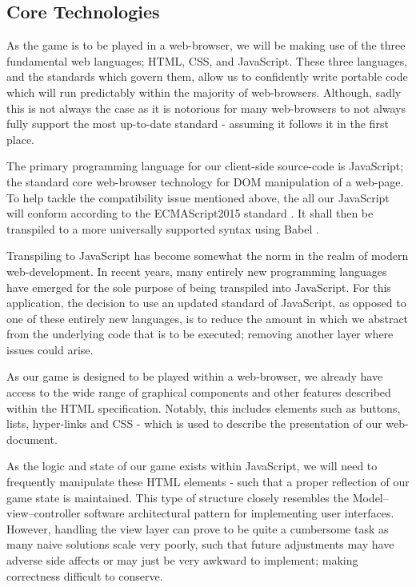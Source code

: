 \documentclass{standalone}
\begin{document}
		\subsection{Core Technologies}
			As the game is to be played in a web-browser, we will be making use of the three fundamental web languages; HTML, CSS, and JavaScript. These three languages, and the standards which govern them, allow us to confidently write portable code which will run predictably within the majority of web-browsers. Although, sadly this is not always the case as it is notorious for many web-browsers to not always fully support the most up-to-date standard - assuming it follows it in the first place.

			The primary programming language for our client-side source-code is JavaScript; the standard core web-browser technology for DOM manipulation of a web-page. To help tackle the compatibility issue mentioned above, the all our JavaScript will conform according to the ECMAScript2015 standard \parencite{ECMAScript2015}. It shall then be transpiled to a more universally supported syntax using Babel \parencite{Babel}.

			Transpiling to JavaScript has become somewhat the norm in the realm of modern web-development. In recent years, many entirely new programming languages have emerged for the sole purpose of being transpiled into JavaScript. For this application, the decision to use an updated standard of JavaScript, as opposed to one of these entirely new languages, is to reduce the amount in which we abstract from the underlying code that is to be executed; removing another layer where issues could arise.

			As our game is designed to be played within a web-browser, we already have access to the wide range of graphical components and other features described within the HTML specification. Notably, this includes elements such as buttons, lists, hyper-links and CSS - which is used to describe the presentation of our web-document.

			As the logic and state of our game exists within JavaScript, we will need to frequently manipulate these HTML elements - such that a proper reflection of our game state is maintained. This type of structure closely resembles the Model–view–controller \parencite{MVC} software architectural pattern for implementing user interfaces. However, handling the view layer can prove to be quite a cumbersome task as many naive solutions scale very poorly, such that future adjustments may have adverse side affects or may just be very awkward to implement; making correctness difficult to conserve.
\end{document}
